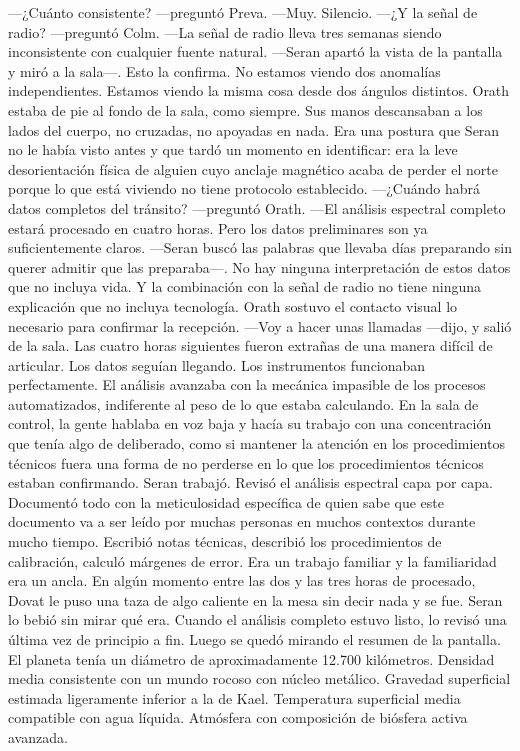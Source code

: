 \documentclass[11pt,a5paper,twoside]{book}
\begin{document}
—¿Cuánto consistente? —preguntó Preva.
—Muy.
Silencio.
—¿Y la señal de radio? —preguntó Colm.
—La señal de radio lleva tres semanas siendo inconsistente con cualquier fuente natural. —Seran apartó la vista de la pantalla y miró a la sala—. Esto la confirma. No estamos viendo dos anomalías independientes. Estamos viendo la misma cosa desde dos ángulos distintos.
Orath estaba de pie al fondo de la sala, como siempre. Sus manos descansaban a los lados del cuerpo, no cruzadas, no apoyadas en nada. Era una postura que Seran no le había visto antes y que tardó un momento en identificar: era la leve desorientación física de alguien cuyo anclaje magnético acaba de perder el norte porque lo que está viviendo no tiene protocolo establecido.
—¿Cuándo habrá datos completos del tránsito? —preguntó Orath.
—El análisis espectral completo estará procesado en cuatro horas. Pero los datos preliminares son ya suficientemente claros. —Seran buscó las palabras que llevaba días preparando sin querer admitir que las preparaba—. No hay ninguna interpretación de estos datos que no incluya vida. Y la combinación con la señal de radio no tiene ninguna explicación que no incluya tecnología.
Orath sostuvo el contacto visual lo necesario para confirmar la recepción.
—Voy a hacer unas llamadas —dijo, y salió de la sala.
Las cuatro horas siguientes fueron extrañas de una manera difícil de articular.
Los datos seguían llegando. Los instrumentos funcionaban perfectamente. El análisis avanzaba con la mecánica impasible de los procesos automatizados, indiferente al peso de lo que estaba calculando. En la sala de control, la gente hablaba en voz baja y hacía su trabajo con una concentración que tenía algo de deliberado, como si mantener la atención en los procedimientos técnicos fuera una forma de no perderse en lo que los procedimientos técnicos estaban confirmando.
Seran trabajó. Revisó el análisis espectral capa por capa. Documentó todo con la meticulosidad específica de quien sabe que este documento va a ser leído por muchas personas en muchos contextos durante mucho tiempo. Escribió notas técnicas, describió los procedimientos de calibración, calculó márgenes de error. Era un trabajo familiar y la familiaridad era un ancla.
En algún momento entre las dos y las tres horas de procesado, Dovat le puso una taza de algo caliente en la mesa sin decir nada y se fue. Seran lo bebió sin mirar qué era.
Cuando el análisis completo estuvo listo, lo revisó una última vez de principio a fin. Luego se quedó mirando el resumen de la pantalla.
El planeta tenía un diámetro de aproximadamente 12.700 kilómetros. Densidad media consistente con un mundo rocoso con núcleo metálico. Gravedad superficial estimada ligeramente inferior a la de Kael. Temperatura superficial media compatible con agua líquida. Atmósfera con composición de biósfera activa avanzada.
\end{document}
